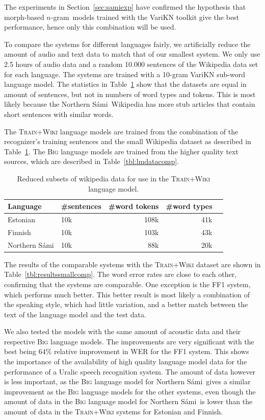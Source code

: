 \documentclass[b5paper]{article}
\newcommand{\ns}{Northern Sámi}
\newcommand{\ngram}{$n$-gram}
\newcommand{\ds}[1]{\textsc{#1}}
\begin{document}
The experiments in Section~\ref{sec:samiexp} have confirmed the hypothesis that morph-based \ngram\ models trained with the VariKN toolkit give the best performance, hence only this combination will be used.

To compare the systems for different languages fairly, we artificially reduce the amount of audio and text data to match that of our smallest system. We only use 2.5 hours of audio data and a random 10.000 sentences of the Wikipedia data set for each language. The systems are trained with a 10-gram VariKN sub-word language model. The statistics in Table~\ref{tbl:lmdatacomp_small} show that the datasets are equal in amount of sentences, but not in numbers of word types and tokens. This is most likely because the \ns\ Wikipedia has more stub articles that contain short sentences with similar words.

The \ds{Train+Wiki} language models are trained from the combination of the recognizer's training sentences and the small Wikipedia dataset as described in Table~\ref{tbl:lmdatacomp_small}. The \ds{Big} language models are trained from the higher quality text sources, which are described in Table~\ref{tbl:lmdatacomp}.

\begin{table}
\centering
\begin{tabular}{llrrr}
\textbf{Language} & \textbf{\#sentences} & \textbf{\#word tokens} & \textbf{\#word types}\\\hline
Estonian &   10k & 108k & 41k \\
 Finnish &   10k  & 103k & 43k \\
 \ns &  10k & 88k & 20k\\
\end{tabular}
\caption{Reduced subsets of wikipedia data for use in the \ds{Train+Wiki} language model.\label{tbl:lmdatacomp_small}}
\end{table}

The results of the comparable systems with the \ds{Train+Wiki} dataset are shown in Table~\ref{tbl:resultssmallcomp}. The word error rates are close to each other, confirming that the systems are comparable. One exception is the FF1 system, which performs much better. This better result is most likely a combination of the speaking style, which had little variation, and a better match between the text of the language model and the test data.

We also tested the models with the same amount of acoustic data and their respective \ds{Big} language models. The improvements are very significant with the best being 64\% relative improvement in WER for the FF1 system. This shows the importance of the availability of high quality language model data for the performance of a Uralic speech recognition system. The amount of data however is less important, as the \ds{Big} language model for \ns\ gives a similar improvement as the \ds{Big} language models for the other systems, even though the amount of data in the \ds{Big} language model for \ns\ is lower than the amount of data in the \ds{Train+Wiki} systems for Estonian and Finnish.
\end{document}
